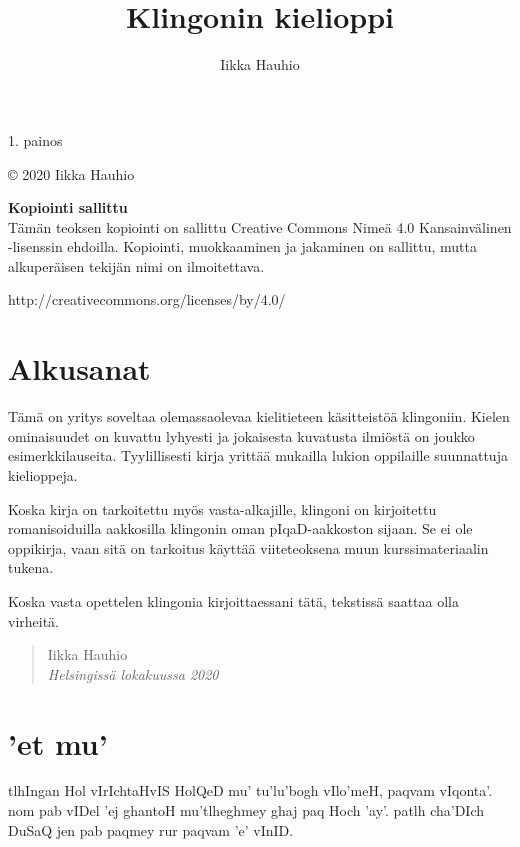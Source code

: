 \documentclass{book}
\title{{\pIqaD   }\\Klingonin kielioppi}
\author{Iikka Hauhio}
\begin{document}
\frontmatter

\maketitle

\newpage
\vspace*{\fill}
1. painos

© 2020 Iikka Hauhio


\textbf{Kopiointi sallittu} \\
Tämän teoksen kopiointi on sallittu Creative Commons Nimeä 4.0 Kansainvälinen -lisenssin ehdoilla.
Kopiointi, muokkaaminen ja jakaminen on sallittu, mutta alkuperäisen tekijän nimi on ilmoitettava.

http://creativecommons.org/licenses/by/4.0/

\chapter{Alkusanat}

Tämä on yritys soveltaa olemassaolevaa kielitieteen käsitteistöä klingoniin.
Kielen ominaisuudet on kuvattu lyhyesti ja jokaisesta kuvatusta ilmiöstä on joukko esimerkkilauseita.
Tyylillisesti kirja yrittää mukailla lukion oppilaille suunnattuja kielioppeja.

Koska kirja on tarkoitettu myös vasta-alkajille, klingoni on kirjoitettu romanisoiduilla aakkosilla klingonin oman pIqaD-aakkoston sijaan.
Se ei ole oppikirja, vaan sitä on tarkoitus käyttää viiteteoksena muun kurssimateriaalin tukena.

Koska vasta opettelen klingonia kirjoittaessani tätä, tekstissä saattaa olla virheitä.

\begin{quote}
    Iikka Hauhio \\
    \textit{Helsingissä lokakuussa 2020}
\end{quote}

\chapter{'et mu'}

tlhIngan Hol vIrIchtaHvIS HolQeD mu' tu'lu'bogh vIlo'meH, paqvam vIqonta'.
nom pab vIDel 'ej ghantoH mu'tlheghmey ghaj paq Hoch 'ay'.
patlh cha'DIch DuSaQ jen pab paqmey rur paqvam 'e' vInID.
\end{document}
